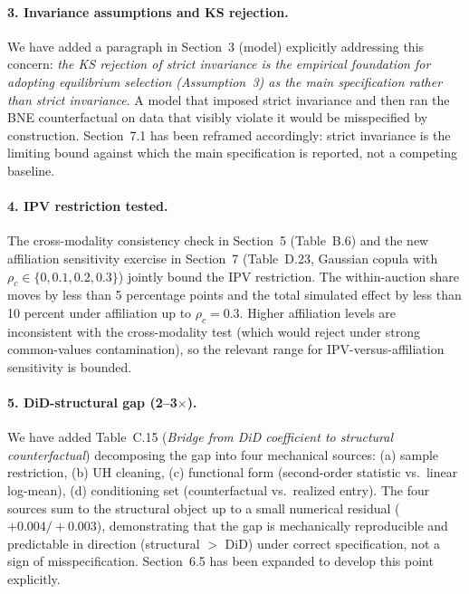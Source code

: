 \documentclass[11pt]{article}
\begin{document}
\paragraph{3. Invariance assumptions and KS rejection.}
We have added a paragraph in Section~3 (model) explicitly addressing this concern: \emph{the KS rejection of strict invariance is the empirical foundation for adopting equilibrium selection (Assumption~3) as the main specification rather than strict invariance}. A model that imposed strict invariance and then ran the BNE counterfactual on data that visibly violate it would be misspecified by construction. Section~7.1 has been reframed accordingly: strict invariance is the limiting bound against which the main specification is reported, not a competing baseline.

\paragraph{4. IPV restriction tested.}
The cross-modality consistency check in Section~5 (Table~B.6) and the new affiliation sensitivity exercise in Section~7 (Table~D.23, Gaussian copula with $\rho_c \in \{0, 0.1, 0.2, 0.3\}$) jointly bound the IPV restriction. The within-auction share moves by less than 5 percentage points and the total simulated effect by less than 10 percent under affiliation up to $\rho_c = 0.3$. Higher affiliation levels are inconsistent with the cross-modality test (which would reject under strong common-values contamination), so the relevant range for IPV-versus-affiliation sensitivity is bounded.

\paragraph{5. DiD-structural gap (2--3$\times$).}
We have added Table~C.15 (\emph{Bridge from DiD coefficient to structural counterfactual}) decomposing the gap into four mechanical sources: (a) sample restriction, (b) UH cleaning, (c) functional form (second-order statistic vs.\ linear log-mean), (d) conditioning set (counterfactual vs.\ realized entry). The four sources sum to the structural object up to a small numerical residual ($+0.004/+0.003$), demonstrating that the gap is mechanically reproducible and predictable in direction (structural $>$ DiD) under correct specification, not a sign of misspecification. Section~6.5 has been expanded to develop this point explicitly.
\end{document}
